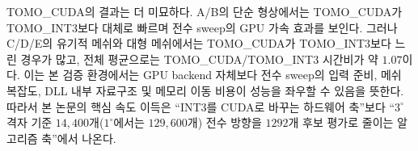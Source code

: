 \documentclass[11pt,a4paper]{article}
\begin{document}
TOMO\_CUDA의 결과는 더 미묘하다.
A/B의 단순 형상에서는 TOMO\_CUDA가 TOMO\_INT3보다 대체로 빠르며
전수 sweep의 GPU 가속 효과를 보인다.
그러나 C/D/E의 유기적 메쉬와 대형 메쉬에서는 TOMO\_CUDA가 TOMO\_INT3보다 느린 경우가 많고,
전체 평균으로는 TOMO\_CUDA/TOMO\_INT3 시간비가 약 $1.07$이다.
이는 본 검증 환경에서는 GPU backend 자체보다 전수 sweep의 입력 준비, 메쉬 복잡도,
DLL 내부 자료구조 및 메모리 이동 비용이 성능을 좌우할 수 있음을 뜻한다.
따라서 본 논문의 핵심 속도 이득은 ``INT3를 CUDA로 바꾸는 하드웨어 축''보다
``$3^\circ$ 격자 기준 $14{,}400$개($1^\circ$에서는 $129{,}600$개) 전수 방향을 $1292$개 후보 평가로 줄이는 알고리즘 축''에서 나온다.

\begin{table}[H]
\footnotesize
\centering
\caption{5-그룹 $35$개 메쉬에 대한 네 구현의 계산 시간.
$t_{\mathrm{INT3}}$와 $t_{\mathrm{CUDA}}$는 각각 TOMO\_INT3/TOMO\_CUDA $3^\circ$ 전수 sweep($\theta_c=60^\circ$) DLL 시간,
$t_{\mathrm{py}}$는 Python SFTF 후보 평가, $t_{\mathrm{C++}}$는 SFTF\_C++ 순수 계산 시간이다.
hit은 Python SFTF 최상위 방향의 유효 면-면 지지 수이다.
Speed columns는 각각 $t_{\mathrm{INT3}}/t_{\mathrm{py}}$와 $t_{\mathrm{INT3}}/t_{\mathrm{C++}}$이다.}
\label{tab:fivegroup-timing}
\end{table}
\end{document}
